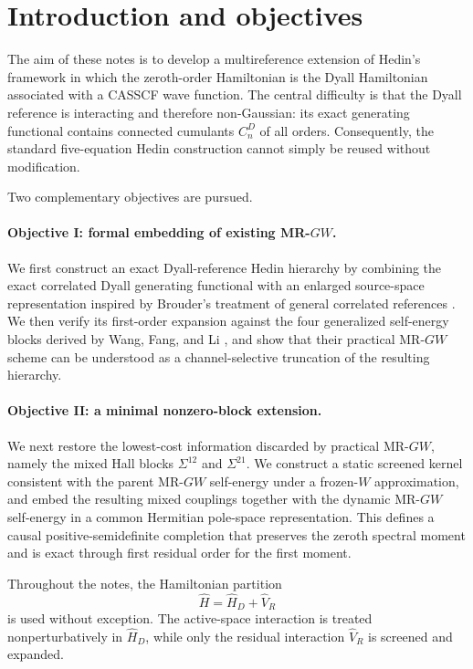 \documentclass[aip,jcp,reprint,noshowkeys,superscriptaddress]{revtex4-1}
\begin{document}
\section{Introduction and objectives}
\label{sec:introduction}

The aim of these notes is to develop a multireference extension of Hedin's
framework in which the zeroth-order Hamiltonian is the Dyall Hamiltonian
associated with a CASSCF wave function.  The central difficulty is that the
Dyall reference is interacting and therefore non-Gaussian: its exact
generating functional contains connected cumulants $C_n^D$ of all orders.
Consequently, the standard five-equation Hedin construction cannot simply be
reused without modification.

Two complementary objectives are pursued.

\paragraph{Objective I: formal embedding of existing MR-$GW$.}
We first construct an exact Dyall-reference Hedin hierarchy by combining the
exact correlated Dyall generating functional with an enlarged source-space
representation inspired by Brouder's treatment of general correlated
references \cite{Brouder2007}.  We then verify its first-order expansion
against the four generalized self-energy blocks derived by Wang, Fang, and Li
\cite{WangFangLi2026}, and show that their practical MR-$GW$ scheme can be
understood as a channel-selective truncation of the resulting hierarchy.

\paragraph{Objective II: a minimal nonzero-block extension.}
We next restore the lowest-cost information discarded by practical MR-$GW$,
namely the mixed Hall blocks $\Sigma^{12}$ and $\Sigma^{21}$.  We construct a
static screened kernel consistent with the parent MR-$GW$ self-energy under a
frozen-$W$ approximation, and embed the resulting mixed couplings together
with the dynamic MR-$GW$ self-energy in a common Hermitian pole-space
representation.  This defines a causal positive-semidefinite completion that
preserves the zeroth spectral moment and is exact through first residual order
for the first moment.

Throughout the notes, the Hamiltonian partition
\begin{equation}
  \hat H=\hat H_D+\hat V_R
  \label{eq:global-partition}
\end{equation}
is used without exception.  The active-space interaction is treated
nonperturbatively in $\hat H_D$, while only the residual interaction
$\hat V_R$ is screened and expanded.
\end{document}
